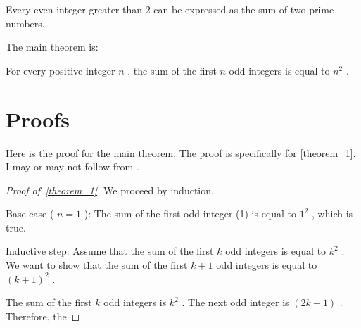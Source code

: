\documentclass{article}
\begin{document}
\begin{lemma}[lemma_1]
\label{lemma_1}
Every even integer greater than 2 can be expressed as the sum of two prime numbers.


\end{lemma}

The main theorem is:

\begin{theorem}[theorem_1]
\label{theorem_1}
For every positive integer  $n$ , the sum of the first  $n$  odd integers is equal to  $n^2$ .


\end{theorem}


\section{Proofs}
\label{section:Proofs}
Here is the proof for the main theorem. The proof is specifically for \autoref{theorem_1}. I may or may not follow from \cite{rudelsonSparseReconstructionFourier2008}.

\begin{proof}[Proof of~{\autoref{theorem_1}}]
\label{proof:theorem_1}
We proceed by induction.

Base case ( $n = 1$ ): The sum of the first odd integer (1) is equal to  $1^2$ , which is true.

Inductive step: Assume that the sum of the first  $k$  odd integers is equal to  $k^2$ . We want to show that the sum of the first  $k+1$  odd integers is equal to  $(k+1)^2$ .

The sum of the first  $k$  odd integers is  $k^2$ . The next odd integer is  $(2k+1)$ . Therefore, the


\end{proof}


\printbibliography
\end{document}
